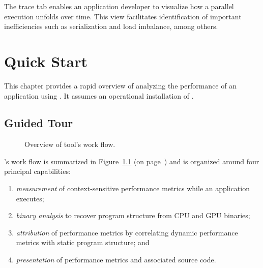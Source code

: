 \documentclass[11pt,twoside,letterpaper]{report}
\begin{document}
The trace tab enables an application developer to visualize how a parallel execution unfolds over time.
This view facilitates identification of important inefficiencies such as serialization and load imbalance, among others.




\cleardoublepage
\chapter{Quick Start}
\label{chpt:quickstart}

This chapter provides a rapid overview of analyzing the performance of an application using \HPCToolkit{}.
It assumes an operational installation of \HPCToolkit{}.



\section{Guided Tour}
\label{chpt:quickstart:tour}

\begin{figure}[t]
\caption{Overview of \HPCToolkit{} tool's work flow.}
\label{fig:hpctoolkit-overview:b}
\end{figure}

\HPCToolkit{}'s work flow is summarized in Figure~\ref{fig:hpctoolkit-overview:b} (on page~\pageref{fig:hpctoolkit-overview:b}) and is organized around four principal capabilities:
\begin{enumerate}
  \item \emph{measurement} of context-sensitive performance metrics while an application executes;
  \item \emph{binary analysis} to recover program structure from CPU and GPU binaries;
  \item \emph{attribution} of performance metrics by correlating dynamic performance metrics with static program structure; and
  \item \emph{presentation} of performance metrics and associated source code.
\end{enumerate}
\end{document}
